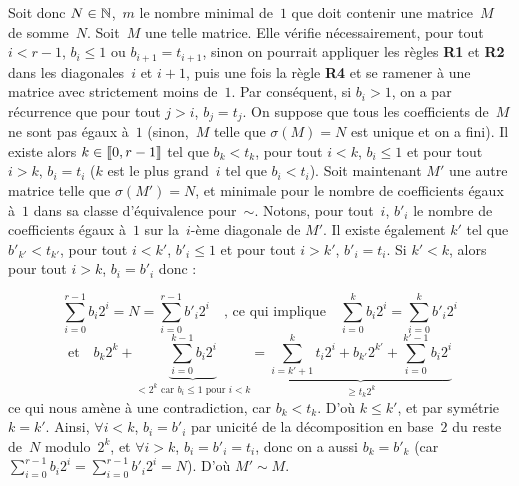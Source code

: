 Soit  donc $N  \in  \mathbb{N}$,~$m$ le  nombre  minimal de~$1$  que  doit contenir  une
matrice~$M$   de  somme~$N$.    Soit~$M$  une   telle  matrice.    Elle  vérifie
néces\-saire\-ment, pour tout $i<r-1$,  $b_i \leq 1$ ou $b_{i+1}=t_{i+1}$, sinon
on  pourrait   appliquer  les  règles   \textbf{R1}  et  \textbf{R2}   dans  les
diagonales~$i$ et $i+1$, puis une fois  la règle \textbf{R4} et se ramener à une
matrice avec strictement  moins de~$1$.  Par conséquent, si $b_i >  1$, on a par
récurrence  que  pour  tout  $j>i$,  $b_j  = t_j$.   On  suppose  que  tous  les
coefficients de~$M$ ne  sont pas égaux à~$1$ (sinon,~$M$  telle que $\sigma(M) =
N$ est  unique et on a fini).   Il existe alors $k  \in [\kern-0.15em [ 0, r-1  ]\kern-0.15em]$ tel que
$b_k<t_k$, pour tout $i<k$, $b_i \leq  1$ et pour tout $i>k$, $b_i=t_i$ ($k$ est
le plus grand~$i$ tel que $b_i < t_i$).
Soit maintenant  $M'$ une autre matrice  telle que $\sigma  (M')=N$, et minimale
pour  le  nombre  de  coefficients  égaux à~$1$  dans  sa  classe  d'équivalence
pour~$\sim$. Notons, pour tout~$i$, $b'_i$ le nombre de coefficients égaux à~$1$
sur la~$i$-ème  diagonale de $M'$. Il  existe également $k'$ tel  que $b'_{k'} <
t_{k'}$, pour  tout $i<k'$, $b'_i  \leq 1$ et  pour tout $i>k'$,  $b'_i=t_i$. Si
$k'<k$, alors pour tout $i>k$, $b_i= b'_i$ donc :


\begin{equation*}
  \sum\limits_{i=0}^{r-1}b_i 2^i = N = \sum\limits_{i=0}^{r-1}b'_i 2^i
  \quad\text{, ce qui implique}\quad \sum\limits_{i=0}^k b_i 2^i = \sum\limits_{i=0}^k b'_i 2^i
\end{equation*}
\begin{equation*}
  \text{et}\quad b_k 2^k + \underbrace{\sum\limits_{i=0}^{k-1} b_i 2^i}_{\text{$< 2^k$ car $b_i \leq 1$ pour $i<k$}} =\underbrace{\sum\limits_{i=k'+1}^k t_i 2^i + b_{k'} 2^{k'} + \sum\limits_{i=0}^{k' -1} b_i 2^i}_{\geq t_k 2^k}
\end{equation*}
ce qui nous amène  à une contradiction, car $b_k<t_k$. D'où $k  \leq k'$, et par
symétrie  $k =  k'$.  Ainsi,  $\forall i<k$,  $b_i  = b'_i$  par  unicité de  la
décomposition en base~$2$ du reste de~$N$ modulo~$2^k$, et $\forall i>k$, $b_i =
b'_i = t_i$, donc on a  aussi $b_k = b'_k$ (car $\sum\limits_{i=0}^{r-1} b_i 2^i
= \sum\limits_{i=0}^{r-1} b'_i 2^i = N$).  D'où $M' \sim M$.

